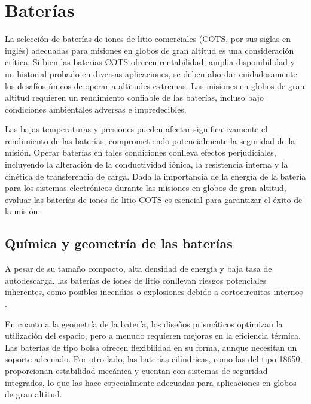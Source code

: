 
\newpage



\section{Baterías}

La selección de baterías de iones de litio comerciales (COTS, por sus siglas en inglés) adecuadas para misiones en globos de gran altitud es una consideración crítica. Si bien las baterías COTS ofrecen rentabilidad, amplia disponibilidad y un historial probado en diversas aplicaciones, se deben abordar cuidadosamente los desafíos únicos de operar a altitudes extremas. Las misiones en globos de gran altitud requieren un rendimiento confiable de las baterías, incluso bajo condiciones ambientales adversas e impredecibles.

Las bajas temperaturas y presiones pueden afectar significativamente el rendimiento de las baterías, comprometiendo potencialmente la seguridad de la misión. Operar baterías en tales condiciones conlleva efectos perjudiciales, incluyendo la alteración de la conductividad iónica, la resistencia interna y la cinética de transferencia de carga\cite{Ma2018,Navarathinam2011}. Dada la importancia de la energía de la batería para los sistemas electrónicos durante las misiones en globos de gran altitud, evaluar las baterías de iones de litio COTS es esencial para garantizar el éxito de la misión.

\subsection{Química y geometría de las baterías}\label{AA} 

A pesar de su tamaño compacto, alta densidad de energía y baja tasa de autodescarga, las baterías de iones de litio conllevan riesgos potenciales inherentes, como posibles incendios o explosiones debido a cortocircuitos internos \cite{Meyer2020}.

En cuanto a la geometría de la batería, los diseños prismáticos optimizan la utilización del espacio, pero a menudo requieren mejoras en la eficiencia térmica. Las baterías de tipo bolsa ofrecen flexibilidad en su forma, aunque necesitan un soporte adecuado. Por otro lado, las baterías cilíndricas, como las del tipo 18650, proporcionan estabilidad mecánica y cuentan con sistemas de seguridad integrados, lo que las hace especialmente adecuadas para aplicaciones en globos de gran altitud\cite{Eleazar2020}.


